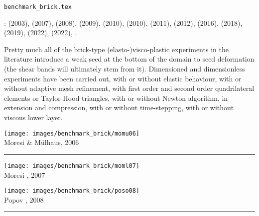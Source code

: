 \begin{flushright} {\tiny {\color{gray} \tt benchmark\_brick.tex}} \end{flushright}

\Literature: 
\textcite{hans03} (2003),
\textcite{moml07} (2007),
\textcite{lemm08} (2008),
\textcite{qurj09} (2009),
\textcite{kaus10} (2010),
\textcite{elga10} (2010),
\textcite{mishin11} (2011),
\textcite{maie12} (2012),
\textcite{spmw16} (2016),
\textcite{gltf18} (2018),
\textcite{frbt19} (2019),
\textcite{dakg22} (2022), 
\textcite{mivg22} (2022),
\textcite{aspectmanual}.

Pretty much all of the brick-type (elasto-)visco-plastic experiments in the literature
introduce a weak seed at the bottom of the domain to seed deformation (the shear bands
will ultimately stem from it). 
Dimensioned and dimensionless experiments have been carried out, with or without 
elastic behaviour, with or without adaptive mesh refinement, with first order and 
second order quadrilateral elements or Taylor-Hood triangles, with or without 
Newton algorithm, in extension and compression, with or without time-stepping,
with or without viscous lower layer. 

\begin{center}
\texttt{[image: images/benchmark\_brick/momu06]}\\
{\captionfont Moresi \& M{\"u}lhaus, 2006 \cite{momu06}}
\end{center}

\begin{center}\noindent\rule{12cm}{0.4pt}\end{center}

\begin{center}
\begin{minipage}{0.45\textwidth}
\centering
\texttt{[image: images/benchmark\_brick/moml07]}\\
{\captionfont Moresi \etal, 2007 \cite{moml07}}
\end{minipage}\hfill
\begin{minipage}{0.45\textwidth}
\centering
\texttt{[image: images/benchmark\_brick/poso08]}\\
{\captionfont Popov \etal, 2008 \cite{poso08}}
\end{minipage}
\end{center}

\begin{center}\noindent\rule{12cm}{0.4pt}\end{center}

